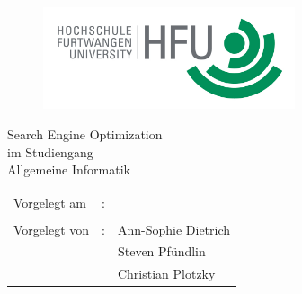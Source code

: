 \begin{titlepage}
\pagestyle{empty}

\begin{flushright}
\begin{figure}[ht]
\flushright
\includegraphics[height=3cm]{content/pictures/hfu.jpg}
\end{figure}
\end{flushright}

\begin{center}
{\fontsize{18}{22} \selectfont Search Engine Optimization}\\[5mm]
{\fontsize{18}{22} \selectfont im Studiengang} \\[5mm]
{\fontsize{18}{22} \selectfont Allgemeine Informatik}\\
\vspace{1cm}
\begin{onehalfspace}


\end{onehalfspace}
\end{center}

\vfill
\begin{center}
\begin{tabular}{lcl}
Vorgelegt am 	&:& \docAbgabedatum 	\\ \\
Vorgelegt von 	&:& Ann-Sophie Dietrich\\
				& & Steven Pfündlin\\
				& & Christian Plotzky\\	
\end{tabular}
\end{center}
\end{titlepage}